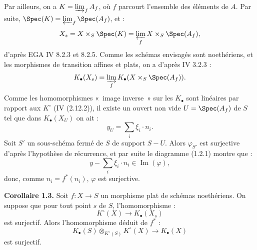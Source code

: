 Par
ailleurs, on a $K=\varinjlim_f A_f$, où $f$ parcourt l'ensemble des éléments de $A$. Par suite, $\Spec(K)=\varprojlim_f\Spec(A_f)$, et :
\[
X_s=X\times_S\Spec(K)=\varprojlim_f X\times_S\Spec(A_f),
\]
d'après EGA IV 8.2.3 et 8.2.5. Comme les schémas envisagés sont noethériens, et les morphismes de transition affines et plats, on a d'après IV 3.2.3 :
\[
K_\bullet(X_s)=\varinjlim_f K_\bullet(X\times_S\Spec(A_f)).
\]
Comme les homomorphismes «~image inverse~» sur les $K_\bullet$ sont linéaires par rapport aux $K^\circ$ (IV (2.12.2)), il existe un ouvert non vide $U=\Spec(A_f)$ de $S$ tel que dans $K_\bullet(X_U)$ on ait :
\[
y_U=\sum_i\xi_i\cdot n_i.
\]
Soit $S'$ un sous-schéma fermé de $S$ de support $S-U$. Alors $\varphi_{S'}$ est surjective d'après l'hypothèse de récurrence, et par suite le diagramme (1.2.1) montre que :
\[
y-\sum_i\xi_i\cdot n_i\in \operatorname{Im}(\varphi),
\]
donc, comme $n_i=f^*(n_i)$, $\varphi$ est surjective.

\textbf{Corollaire 1.3.} Soit $f:X\to S$ un morphisme plat de schémas noethériens. On suppose que pour tout point $s$ de $S$, l'homomorphisme :
\[
K^\circ(X)\longrightarrow K_\bullet(X_s)
\]
est surjectif. Alors l'homomorphisme déduit de $f^*$ :
\[
K_\bullet(S)\otimes_{K^\circ(S)}K^\circ(X)\longrightarrow K_\bullet(X)
\]
est surjectif.

